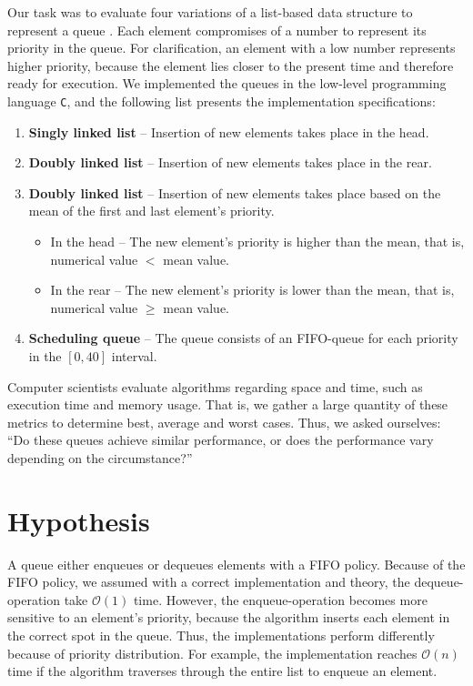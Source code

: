 \documentclass[a4paper,11pt]{kth-mag}
\newcommand*{\skippara}{\par\vspace{\baselineskip} \noindent}
\begin{document}
\skippara Our task was to evaluate four variations of a list-based data structure to represent a queue \cite{Uppgiftl9:online}.
Each element compromises of a number to represent its priority in the queue.
For clarification, an element with a low number represents higher priority, because the element lies closer to the present time and therefore ready for execution.
We implemented the queues in the low-level programming language \texttt{C}, and the following list presents the implementation specifications:
\begin{enumerate}
    \item \textbf{Singly linked list} -- Insertion of new elements takes place in the head.
    \item \textbf{Doubly linked list} -- Insertion of new elements takes place in the rear.
    \item \textbf{Doubly linked list} -- Insertion of new elements takes place based on the mean of the first and last element's priority.
        \begin{itemize}
            \item In the head -- The new element's priority is higher than the mean, that is, \\numerical value $<$ mean value.
            \item In the rear -- The new element's priority is lower than the mean, that is,\\numerical value $\ge$ mean value.
        \end{itemize}
    \item \textbf{Scheduling queue} -- The queue consists of an FIFO-queue for each priority in the $[0,40]$ interval.
\end{enumerate}

\skippara
Computer scientists evaluate algorithms regarding space and time, such as execution time and memory usage.
That is, we gather a large quantity of these metrics to determine best, average and worst cases.
Thus, we asked ourselves: ``Do these queues achieve similar performance, or does the performance vary depending on the circumstance?''


\clearpage
\section{Hypothesis}
A queue either enqueues or dequeues elements with a FIFO policy.
Because of the FIFO policy, we assumed with a correct implementation and theory, the dequeue- operation take $\mathcal{O}(1)$ time.
However, the enqueue-operation becomes more sensitive to an element's priority, because the algorithm inserts each element in the correct spot in the queue.
Thus, the implementations perform differently because of priority distribution.
For example, the implementation reaches $\mathcal{O}(n)$ time if the algorithm traverses through the entire list to enqueue an element.
\end{document}
